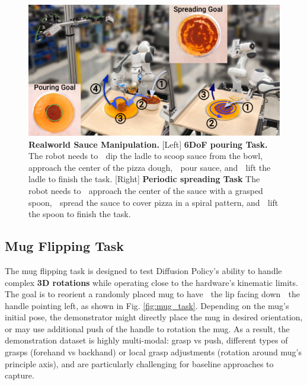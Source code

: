 \begin{figure}[t]
\centering
\includegraphics[width=\linewidth]{figure/real_sauce_setup.pdf}

\vspace{1.5mm}

\caption{\textbf{Realworld Sauce Manipulation. } 
\label{fig:real_sauce_manipulation}
[Left] \textbf{6DoF pouring Task.} The robot needs to \textcircled{} dip the ladle to scoop sauce from the bowl, \textcircled{} approach the center of the pizza dough, \textcircled{} pour sauce, and \textcircled{} lift the ladle to finish the task.
[Right] \textbf{Periodic spreading Task} The robot needs to \textcircled{} approach the center of the sauce with a grasped spoon, \textcircled{} spread the sauce to cover pizza in a spiral pattern, and \textcircled{} lift the spoon to finish the task.
}

\vspace{-4mm}
\end{figure}

\subsection{Mug Flipping Task}
The mug flipping task is designed to test Diffusion Policy's ability to handle complex \textbf{3D rotations} while operating close to the hardware's kinematic limits.
The goal is to reorient a randomly placed mug to have \textcircled{} the lip facing down \textcircled{} the handle pointing left, as shown in Fig. \ref{fig:mug_task}.
Depending on the mug's initial pose, the demonstrator might directly place the mug in desired orientation, or may use additional push of the handle to rotation the mug.
As a result, the demonstration dataset is highly multi-modal: grasp vs push, different types of grasps (forehand vs backhand) or local grasp adjustments (rotation around mug's principle axis), and are particularly challenging for baseline approaches to capture. 

